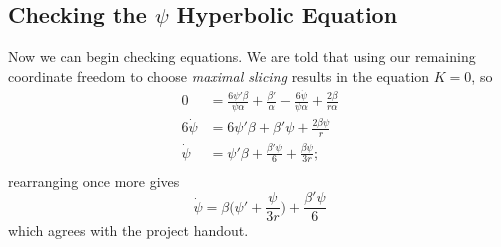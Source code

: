 \documentclass[12pt]{article}
\numberwithin{equation}{section}
\begin{document}
\subsection{Checking the $\psi$ Hyperbolic Equation}
Now we can begin checking equations.  We are told that using our remaining coordinate freedom to choose \textit{maximal slicing} results in the equation $K = 0$, so
\begin{equation}
\begin{aligned}
0 &= \frac{6 \psi' \beta}{\psi \alpha} + \frac{\beta'}{\alpha} - \frac{6 \dot{\psi}}{\psi \alpha} + \frac{2 \beta}{r \alpha} \\
6 \dot{\psi} &= 6 \psi' \beta + \beta' \psi + \frac{2 \beta \psi}{r} \\
\dot{\psi} &= \psi' \beta + \frac{\beta' \psi}{6} + \frac{\beta \psi}{3 r}; \\
\end{aligned}
\end{equation}
rearranging once more gives
\begin{equation}
\boxed{\dot{\psi} = \beta \Big(\psi' + \frac{\psi}{3 r} \Big) + \frac{\beta' \psi}{6} }
\end{equation}
which agrees with the project handout.
\end{document}
